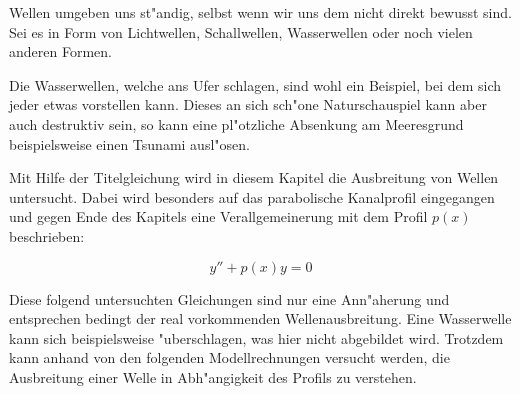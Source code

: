 Wellen umgeben uns st"andig, selbst wenn wir uns dem nicht direkt bewusst sind. 
Sei es in Form von Lichtwellen, Schallwellen, Wasserwellen oder noch vielen 
anderen Formen.

Die Wasserwellen, welche ans Ufer schlagen, sind wohl ein Beispiel, bei dem 
sich jeder etwas vorstellen kann. Dieses an sich sch"one 
Naturschauspiel kann aber auch destruktiv sein, so kann eine pl"otzliche 
Absenkung am Meeresgrund beispielsweise einen Tsunami ausl"osen.

Mit Hilfe der Titelgleichung wird in diesem Kapitel die Ausbreitung von Wellen 
untersucht. Dabei wird besonders auf das parabolische Kanalprofil eingegangen 
und gegen Ende des Kapitels eine Verallgemeinerung mit dem Profil $p(x)$ 
beschrieben:

\begin{equation*}
y'' + p(x) y = 0
\end{equation*}

Diese folgend untersuchten Gleichungen sind nur eine Ann"aherung und 
entsprechen bedingt der real vorkommenden Wellenausbreitung. Eine Wasserwelle 
kann sich beispielsweise "uberschlagen, was hier nicht abgebildet wird. 
Trotzdem kann anhand von den folgenden Modellrechnungen versucht werden, die 
Ausbreitung einer Welle in Abh"angigkeit des Profils zu verstehen.
